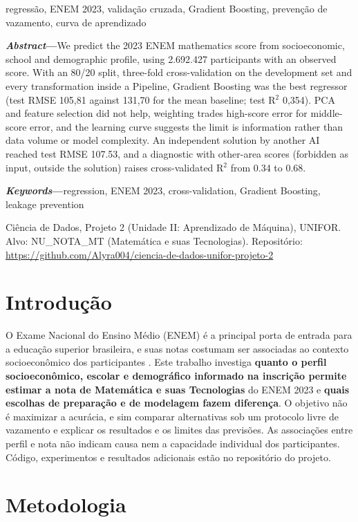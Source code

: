 \documentclass[conference,a4paper]{IEEEtran}
\begin{document}
\begin{IEEEkeywords}
regressão, ENEM 2023, validação cruzada, Gradient Boosting, prevenção de vazamento, curva de aprendizado
\end{IEEEkeywords}

\noindent\textbf{\textit{Abstract}---}We predict the 2023 ENEM mathematics score from socioeconomic, school and demographic profile, using 2.692.427 participants with an observed score. With an 80/20 split, three-fold cross-validation on the development set and every transformation inside a Pipeline, Gradient Boosting was the best regressor (test RMSE 105,81 against 131,70 for the mean baseline; test R$^2$ 0,354). PCA and feature selection did not help, weighting trades high-score error for middle-score error, and the learning curve suggests the limit is information rather than data volume or model complexity. An independent solution by another AI reached test RMSE 107.53, and a diagnostic with other-area scores (forbidden as input, outside the solution) raises cross-validated R$^2$ from 0.34 to 0.68.

\smallskip\noindent\textbf{\textit{Keywords}---}regression, ENEM 2023, cross-validation, Gradient Boosting, leakage prevention

\noindent Ciência de Dados, Projeto 2 (Unidade II: Aprendizado de Máquina), UNIFOR. Alvo: NU\_NOTA\_MT (Matemática e suas Tecnologias). Repositório: \url{https://github.com/Alyra004/ciencia-de-dados-unifor-projeto-2}

\section{Introdução}
O Exame Nacional do Ensino Médio (ENEM) é a principal porta de entrada para a educação superior brasileira, e suas notas costumam ser associadas ao contexto socioeconômico dos participantes \cite{inep}. Este trabalho investiga \textbf{quanto o perfil socioeconômico, escolar e demográfico informado na inscrição permite estimar a nota de Matemática e suas Tecnologias} do ENEM 2023 e \textbf{quais escolhas de preparação e de modelagem fazem diferença}. O objetivo não é maximizar a acurácia, e sim comparar alternativas sob um protocolo livre de vazamento e explicar os resultados e os limites das previsões. As associações entre perfil e nota não indicam causa nem a capacidade individual dos participantes. Código, experimentos e resultados adicionais estão no repositório do projeto.


\section{Metodologia}
\end{document}
